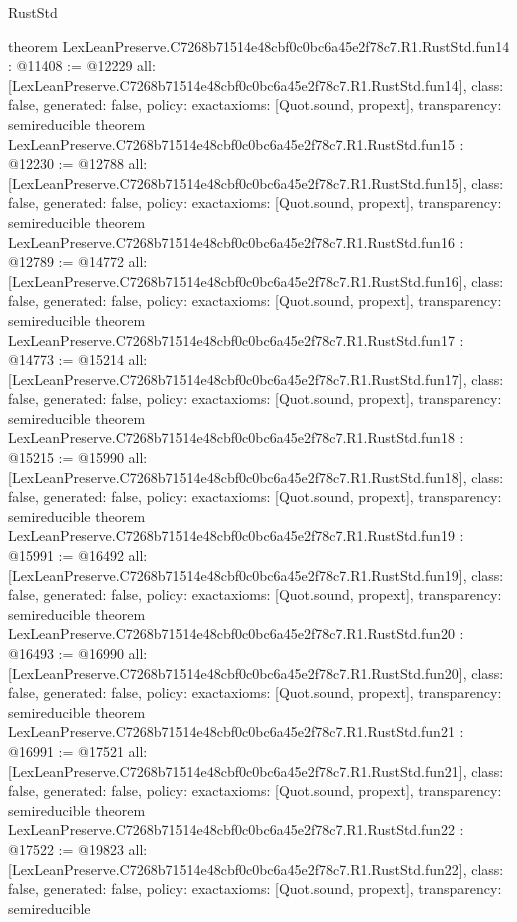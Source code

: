\begin{lexlean}{RustStd}
\begin{coremodule}
{}
theorem LexLeanPreserve.C7268b71514e48cbf0c0bc6a45e2f78c7.R1.RustStd.fun14 : @11408 := @12229 {
  all: [LexLeanPreserve.C7268b71514e48cbf0c0bc6a45e2f78c7.R1.RustStd.fun14],
  class: false,
  generated: false,
  policy: exact{axioms: [Quot.sound, propext]},
  transparency: semireducible
}
theorem LexLeanPreserve.C7268b71514e48cbf0c0bc6a45e2f78c7.R1.RustStd.fun15 : @12230 := @12788 {
  all: [LexLeanPreserve.C7268b71514e48cbf0c0bc6a45e2f78c7.R1.RustStd.fun15],
  class: false,
  generated: false,
  policy: exact{axioms: [Quot.sound, propext]},
  transparency: semireducible
}
theorem LexLeanPreserve.C7268b71514e48cbf0c0bc6a45e2f78c7.R1.RustStd.fun16 : @12789 := @14772 {
  all: [LexLeanPreserve.C7268b71514e48cbf0c0bc6a45e2f78c7.R1.RustStd.fun16],
  class: false,
  generated: false,
  policy: exact{axioms: [Quot.sound, propext]},
  transparency: semireducible
}
theorem LexLeanPreserve.C7268b71514e48cbf0c0bc6a45e2f78c7.R1.RustStd.fun17 : @14773 := @15214 {
  all: [LexLeanPreserve.C7268b71514e48cbf0c0bc6a45e2f78c7.R1.RustStd.fun17],
  class: false,
  generated: false,
  policy: exact{axioms: [Quot.sound, propext]},
  transparency: semireducible
}
theorem LexLeanPreserve.C7268b71514e48cbf0c0bc6a45e2f78c7.R1.RustStd.fun18 : @15215 := @15990 {
  all: [LexLeanPreserve.C7268b71514e48cbf0c0bc6a45e2f78c7.R1.RustStd.fun18],
  class: false,
  generated: false,
  policy: exact{axioms: [Quot.sound, propext]},
  transparency: semireducible
}
theorem LexLeanPreserve.C7268b71514e48cbf0c0bc6a45e2f78c7.R1.RustStd.fun19 : @15991 := @16492 {
  all: [LexLeanPreserve.C7268b71514e48cbf0c0bc6a45e2f78c7.R1.RustStd.fun19],
  class: false,
  generated: false,
  policy: exact{axioms: [Quot.sound, propext]},
  transparency: semireducible
}
theorem LexLeanPreserve.C7268b71514e48cbf0c0bc6a45e2f78c7.R1.RustStd.fun20 : @16493 := @16990 {
  all: [LexLeanPreserve.C7268b71514e48cbf0c0bc6a45e2f78c7.R1.RustStd.fun20],
  class: false,
  generated: false,
  policy: exact{axioms: [Quot.sound, propext]},
  transparency: semireducible
}
theorem LexLeanPreserve.C7268b71514e48cbf0c0bc6a45e2f78c7.R1.RustStd.fun21 : @16991 := @17521 {
  all: [LexLeanPreserve.C7268b71514e48cbf0c0bc6a45e2f78c7.R1.RustStd.fun21],
  class: false,
  generated: false,
  policy: exact{axioms: [Quot.sound, propext]},
  transparency: semireducible
}
theorem LexLeanPreserve.C7268b71514e48cbf0c0bc6a45e2f78c7.R1.RustStd.fun22 : @17522 := @19823 {
  all: [LexLeanPreserve.C7268b71514e48cbf0c0bc6a45e2f78c7.R1.RustStd.fun22],
  class: false,
  generated: false,
  policy: exact{axioms: [Quot.sound, propext]},
  transparency: semireducible
}
\end{coremodule}
\end{lexlean}
